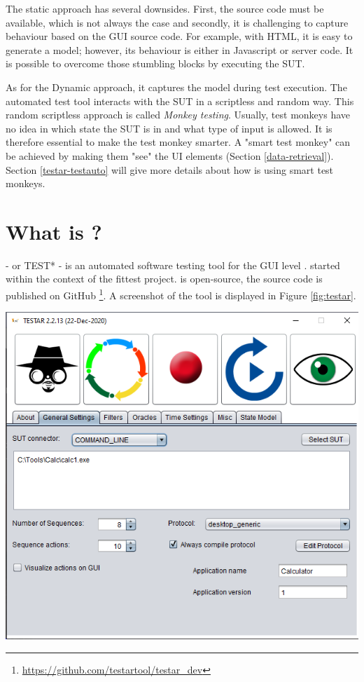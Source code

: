 The static approach has several downsides. First, the source code must be available, which is not always the case and secondly, it is challenging to capture behaviour based on the GUI source code. For example, with HTML, it is easy to generate a model; however, its behaviour is either in Javascript or server code.  It is possible to overcome those stumbling blocks by executing the SUT.
    
As for the Dynamic approach, it captures the model during test execution. The automated test tool interacts with the SUT in a scriptless and random way. This random scriptless approach is called \emph{Monkey testing}. Usually, test monkeys have no idea in which state the SUT is in and what type of input is allowed. It is therefore essential to make the test monkey smarter. A "smart test monkey" can be achieved by making them "see" the UI elements (Section \ref{data-retrieval}). Section \ref{testar-testauto} will give more details about how \testar is using smart test monkeys.

\section{What is \testar?} \label{what-is-testar}
\testar - or TEST* - is an automated software testing tool for the GUI level \cite{testar-about}. \testar started within the context of the \acrfull{fittest} project. \testar is open-source, the source code is published on GitHub \footnote{ \url{https://github.com/testartool/testar\_dev}}. A screenshot of the \testar tool is displayed in Figure \ref{fig:testar}.

\bigskip
\begingroup
\captionsetup{type=figure}
\includegraphics[scale=0.5]{images/testar.png}
\label{fig:testar}
\endgroup

